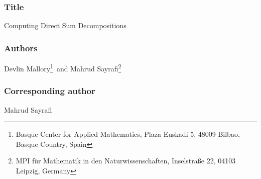 \documentclass[12pt]{article}
\begin{document}
\subsubsection*{Title}
Computing Direct Sum Decompositions
\subsubsection*{Authors} Devlin Mallory\footnote{Basque Center for Applied Mathematics, Plaza Euskadi 5, 48009 Bilbao, Basque Country,  Spain}~and Mahrud Sayrafi\footnote{MPI für Mathematik in den Naturwissenschaften, Inselstraße 22, 04103 Leipzig, Germany}
\subsubsection*{Corresponding author} Mahrud Sayrafi
\end{document}
